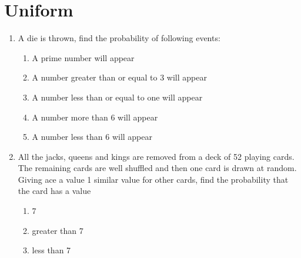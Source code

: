     \section{Uniform}
\begin{enumerate}[label=\thesection.\arabic*,ref=\thesection.\theenumi]
\item A die is thrown, find the probability of following events:
\begin{enumerate}
\item A prime number will appear
\item A number greater than or equal to 3 will appear
\item A number less than or equal to one will appear
\item A number more than 6 will appear
\item A number less than 6 will appear
\end{enumerate}
\solution

\item All the jacks, queens and kings are removed from a deck of 52 playing cards. The remaining cards are well shuffled and then one card is drawn at random. Giving ace a value 1 similar value for other cards, find the probability that the card has a value 
\begin{enumerate}
	\item 7
	\item greater than 7
	\item less than 7
\end{enumerate}

    \end{enumerate}

